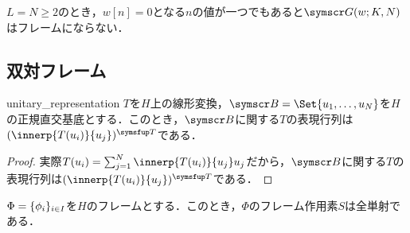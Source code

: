 \documentclass[../../main]{subfiles}
\begin{document}
\begin{example}
  \(L=N\geq 2\)のとき，\(w[n]=0\)となる\(n\)の値が一つでもあると\(\gaborsys{w}{K}{N}\)はフレームにならない．
\end{example}

\subsection{双対フレーム}

\begin{lemma}{}{unitary_representation}
  \(T\)を\(H\)上の線形変換，\(\basis{B}=\Set{u_1,\dots,u_N}\)を\(H\)の正規直交基底とする．このとき，\(\basis{B}\)に関する\(T\)の表現行列は\(\trps{\matfence{\innerp{T(u_i)}{u_j}}}\)である．
\end{lemma}

\begin{proof}
  実際\(T(u_i)=\sum_{j=1}^N\innerp{T(u_i)}{u_j}u_j\)だから，\(\basis{B}\)に関する\(T\)の表現行列は\(\trps{\matfence{\innerp{T(u_i)}{u_j}}}\)である．
\end{proof}

\begin{proposition}{}{}
  \(\Phi=\lbrace\phi_i\rbrace_{i\in I}\)を\(H\)のフレームとする．このとき，\(\Phi\)のフレーム作用素\(S\)は全単射である．
\end{proposition}
\end{document}
